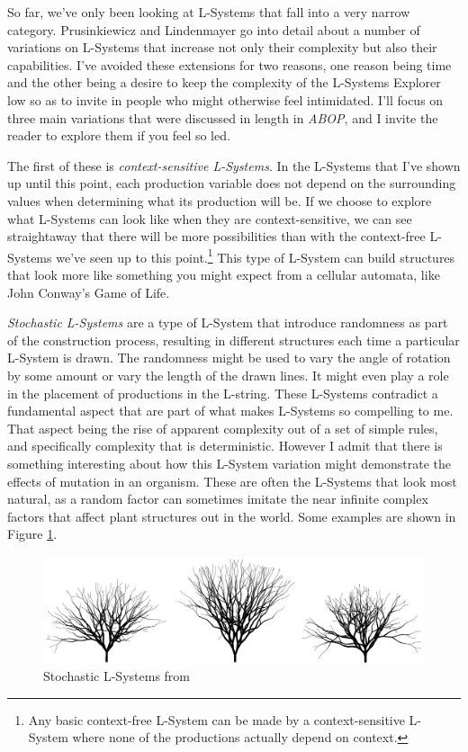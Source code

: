\documentclass[12pt,twoside]{reedthesis}
\begin{document}
So far, we've only been looking at L-Systems that fall into a very narrow category. Prusinkiewicz and Lindenmayer go into detail about a number of variations on L-Systems that increase not only their complexity but also their capabilities. I've avoided these extensions for two reasons, one reason being time and the other being a desire to keep the complexity of the L-Systems Explorer low so as to invite in people who might otherwise feel intimidated. I'll focus on three main variations that were discussed in length in \textit{ABOP}, and I invite the reader to explore them if you feel so led.

	The first of these is \textit{context-sensitive L-Systems}. In the L-Systems that I've shown up until this point, each production variable does not depend on the surrounding values when determining what its production will be. If we choose to explore what L-Systems can look like when they are context-sensitive, we can see straightaway that there will be more possibilities than with the context-free L-Systems we've seen up to this point.\footnote{Any basic context-free L-System can be made by a context-sensitive L-System where none of the productions actually depend on context.} This type of L-System can build structures that look more like something you might expect from a cellular automata, like John Conway's Game of Life.
	
	
	\textit{Stochastic L-Systems} are a type of L-System that introduce randomness as part of the construction process, resulting in different structures each time a particular L-System is drawn. The randomness might be used to vary the angle of rotation by some amount or vary the length of the drawn lines. It might even play a role in the placement of productions in the L-string. These L-Systems contradict a fundamental aspect that are part of what makes L-Systems so compelling to me. That aspect being the rise of apparent complexity out of a set of simple rules, and specifically complexity that is deterministic. However I admit that there is something interesting about how this L-System variation might demonstrate the effects of mutation in an organism. These are often the L-Systems that look most natural, as a random factor can sometimes imitate the near infinite complex factors that affect plant structures out in the world. Some examples are shown in Figure \ref{Stochastic}.
	
	\begin{figure}[h]
	\centering
	\includegraphics[width=0.8\linewidth]{Images/Stochastic}
	\caption{Stochastic L-Systems from \cite{LSystems2001}}
	\label{Stochastic}
	\end{figure}
	
\end{document}
